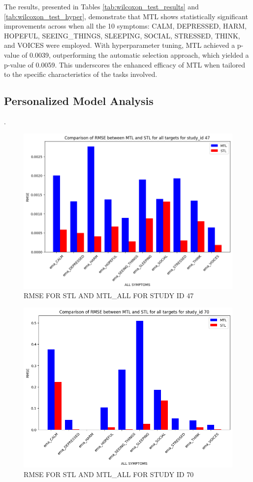 The results, presented in Tables \ref{tab:wilcoxon_test_results} and \ref{tab:wilcoxon_test_hyper}, demonstrate that MTL shows statistically significant improvements across when all the 10 symptoms: CALM, DEPRESSED, HARM, HOPEFUL, SEEING\_THINGS, SLEEPING, SOCIAL, STRESSED, THINK, and VOICES were employed. With hyperparameter tuning, MTL achieved a p-value of 0.0039, outperforming the automatic selection approach, which yielded a p-value of 0.0059. This underscores the enhanced efficacy of MTL when tailored to the specific characteristics of the tasks involved.


 







\subsection{Personalized Model Analysis}
. 
\begin{figure} [H]
    \centering
    \includegraphics[width=0.5\linewidth]{RMSE_ALL_AUTO_47.png}
    \caption{RMSE FOR STL AND MTL\_ALL FOR STUDY ID 47}
    \label{RMSE_ALL_47}
\end{figure}

\begin{figure}[H]
    \centering
    \includegraphics[width=0.5\linewidth]{RMSE_ALL_AUTO_70.png}
    \caption{RMSE FOR STL AND MTL\_ALL FOR STUDY ID 70}
    \label{RMSE_ALL_70}
\end{figure}

